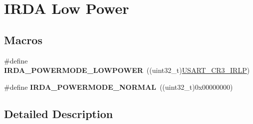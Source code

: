 \hypertarget{group___i_r_d_a___low___power}{}\section{I\+R\+DA Low Power}
\label{group___i_r_d_a___low___power}
\subsection*{Macros}
\begin{DoxyCompactItemize}
\item 
\#define {\bfseries I\+R\+D\+A\+\_\+\+P\+O\+W\+E\+R\+M\+O\+D\+E\+\_\+\+L\+O\+W\+P\+O\+W\+ER}~((uint32\+\_\+t)\hyperlink{group___peripheral___registers___bits___definition_ga22af8d399f1adda62e31186f0309af80}{U\+S\+A\+R\+T\+\_\+\+C\+R3\+\_\+\+I\+R\+LP})\hypertarget{group___i_r_d_a___low___power_ga261eafd053023b5935b50767058c804b}{}\label{group___i_r_d_a___low___power_ga261eafd053023b5935b50767058c804b}

\item 
\#define {\bfseries I\+R\+D\+A\+\_\+\+P\+O\+W\+E\+R\+M\+O\+D\+E\+\_\+\+N\+O\+R\+M\+AL}~((uint32\+\_\+t)0x00000000)\hypertarget{group___i_r_d_a___low___power_ga28e06e6f6e185f066d492e2d3cdb7e89}{}\label{group___i_r_d_a___low___power_ga28e06e6f6e185f066d492e2d3cdb7e89}

\end{DoxyCompactItemize}


\subsection{Detailed Description}
